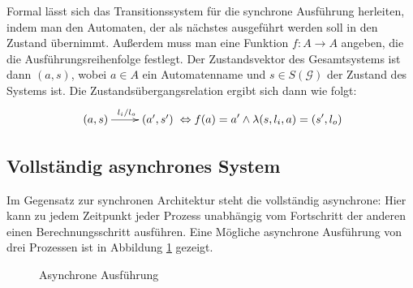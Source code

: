 Formal lässt sich das Transitionssystem für die synchrone Ausführung herleiten, indem man den Automaten, der als nächstes ausgeführt werden soll in den Zustand übernimmt.
Außerdem muss man eine Funktion $f : A\rightarrow A$ angeben, die die Ausführungsreihenfolge festlegt.
Der Zustandsvektor des Gesamtsystems ist dann $(a,s)$, wobei $a\in A$ ein Automatenname und $s\in S(\mathcal{G})$ der Zustand des Systems ist.
Die Zustandsübergangsrelation ergibt sich dann wie folgt:
\[ \xymatrix { (a,s) \ar[r]^{l_i/l_o} & (a',s') } \Leftrightarrow f(a)=a'\land \lambda(s,l_i,a) = (s',l_o) \]

\subsection{Vollständig asynchrones System}
Im Gegensatz zur synchronen Architektur steht die vollständig asynchrone: 
Hier kann zu jedem Zeitpunkt jeder Prozess unabhängig vom Fortschritt der anderen einen Berechnungsschritt ausführen.
Eine Mögliche asynchrone Ausführung von drei Prozessen ist in Abbildung \ref{fig:asynchronous_execution} gezeigt.
\begin{figure}[h]
  \centering
  \caption{Asynchrone Ausführung}
  \label{fig:asynchronous_execution}
\end{figure}

